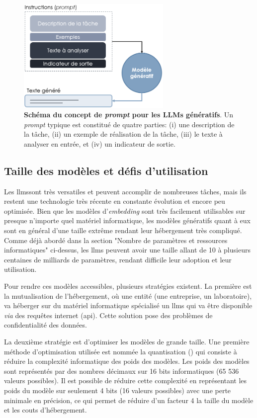 \begin{figure}[!ht]
 \centering
 \includegraphics[width=0.66\textwidth]{figures/promt_llm.png}
 \caption[Schéma du concept de \textit{prompt} pour les LLMs génératifs]{\textbf{Schéma du concept de \textit{prompt} pour les LLMs génératifs}. Un \textit{prompt} typique est constitué de quatre parties: (i) une description de la tâche, (ii) un exemple de réalisation de la tâche, (iii) le texte à analyser en entrée, et (iv) un indicateur de sortie.}
 \label{fig:llm-prompt}
\end{figure}

\subsection{Taille des modèles et défis d'utilisation}
Les \gls{llms}sont très versatiles et peuvent accomplir de nombreuses tâches, mais ils restent une technologie très récente en constante évolution et encore peu optimisée. Bien que les modèles d'\textit{embedding} sont très facilement utilisables sur presque n'importe quel matériel informatique, les modèles génératifs quant à eux sont en général d'une taille extrême rendant leur hébergement très compliqué. Comme déjà abordé dans la section "Nombre de paramètres et ressources informatiques" ci-dessus, les \gls{llms} peuvent avoir une taille allant de 10 à plusieurs centaines de milliards de paramètres, rendant difficile leur adoption et leur utilisation.


Pour rendre ces modèles accessibles, plusieurs stratégies existent. La première est la mutualisation de l'hébergement, où une entité (une entreprise, un laboratoire), va héberger sur du matériel informatique spécialisé un \gls{llms} qui va être disponible \textit{via} des requêtes internet (\gls{api}). Cette solution pose des problèmes de confidentialité des données. 

La deuxième stratégie est d'optimiser les modèles de grande taille. Une première méthode d'optimisation utilisée est nommée la quantisation (\cite{dettmers_case_2023, dettmers_llmint8_2022}) qui consiste à réduire la complexité informatique des poids des modèles. Les poids des modèles sont représentés par des nombres décimaux sur 16 bits informatiques (65 536 valeurs possibles). Il est possible de réduire cette complexité en représentant les poids du modèle sur seulement 4 bits (16 valeurs possibles) avec une perte minimale en précision, ce qui permet de réduire d'un facteur 4 la taille du modèle et les couts d'hébergement.

